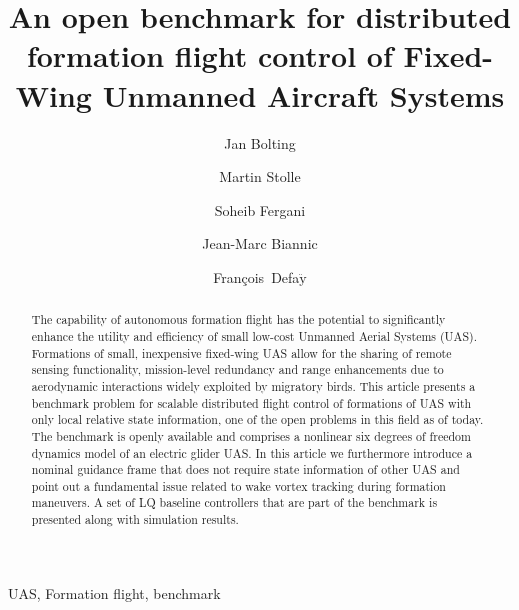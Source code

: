 \documentclass{ifacconf}
\newcommand{\Francois}{\mbox{Fran\c{c}ois Defa$\ddot{\textrm{y}}$}}
\begin{document}
\begin{frontmatter}

\title{An open benchmark for distributed formation flight control of Fixed-Wing Unmanned Aircraft Systems}

\author[First]{Jan Bolting}
\author[Second]{Martin Stolle}
\author[First]{Soheib Fergani}
\author[Second]{Jean-Marc Biannic}
\author[First]{\Francois}
 
\address[First]{Institut Supérieur de l'Aéronautique et de l'Espace (ISAE),
    31055 Toulouse, France (e-mail: jan.bolting@isae.fr, soheib.fergani@isae.fr, francois.defay@isae.fr)}
\address[Second]{Office National d'Études et de Recherches Aérospatiales (ONERA),
    31055 Toulouse, France (e-mail: jean-marc.biannic@onera.fr, martin.stolle@onera.fr)}
 
 

\begin{abstract}
The capability of autonomous formation flight has the potential to significantly enhance the utility and efficiency of small low-cost Unmanned Aerial Systems (UAS). Formations of small, inexpensive fixed-wing UAS allow for the sharing of remote sensing functionality, mission-level redundancy and range enhancements due to aerodynamic interactions widely exploited by migratory birds. This article presents a benchmark problem for scalable distributed flight control of formations of UAS with only local relative state information, one of the open problems in this field as of today. The benchmark is openly available and comprises a nonlinear six degrees of freedom dynamics model of an electric glider UAS.
In this article we furthermore introduce a nominal guidance frame that does not require state information of other UAS and point out a fundamental issue related to wake vortex tracking during formation maneuvers.
A set of LQ baseline controllers that are part of the benchmark is presented along with simulation results.
\end{abstract}

\begin{keyword}
UAS, Formation flight, benchmark
\end{keyword}

\end{frontmatter}
\end{document}
